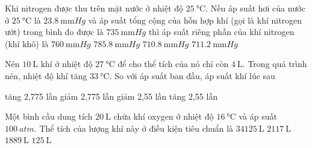 \begin{ex}
	Khi nitrogen được thu trên mặt nước ở nhiệt độ $\SI{25}{\celsius}$. Nếu áp suất hơi của nước ở $\SI{25}{\celsius}$ là $\SI{23.8}{\milli\meter Hg}$ và áp suất tổng cộng của hỗn hợp khí (gọi là khí nitrogen ướt) trong bình đo được là $\SI{735}{\milli\meter Hg}$ thì áp suất riêng phần của khí nitrogen (khí khô) là
	\choice
	{$\SI{760}{\milli\meter Hg}$}
	{$\SI{785.8}{\milli\meter Hg}$}
	{$\SI{710.8}{\milli\meter Hg}$}
	{\True $\SI{711.2}{\milli\meter Hg}$}
	\loigiai{}
\end{ex}
\begin{ex}
	Nén $\SI{10}{\liter}$ khí ở nhiệt độ $\SI{27}{\celsius}$ để cho thể tích của nó chỉ còn $\SI{4}{\liter}$. Trong quá trình nén, nhiệt độ khí tăng $\SI{33}{\celsius}$. So với áp suất ban đầu, áp suất khí lúc sau
	
	\choice
	{\True tăng 2,775 lần}
	{giảm 2,775 lần}
	{giảm 2,55 lần}
	{tăng 2,55 lần}
\end{ex}
\begin{ex}
	Một bình cầu dung tích $\SI{20}{\liter}$ chứa khí oxygen ở nhiệt độ $\SI{16}{\celsius}$ và áp suất $\SI{100}{atm}$. Thể tích của lượng khí này ở điều kiện tiêu chuẩn là
	\choice
	{$\SI{34125}{\liter}$}
	{$\SI{2117}{\liter}$}
	{\True $\SI{1889}{\liter}$}
	{$\SI{125}{\liter}$}
\end{ex}
